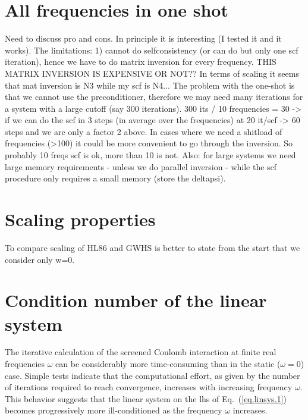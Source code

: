 \documentclass[twocolumn,prb,showpacs,superscriptaddress]{revtex4}
\def\w{\omega}
\begin{document}
\section{All frequencies in one shot}

Need to discuss pro and cons. In principle it is interesting (I tested it and it works).
The limitations: 1) cannot do selfconsistency (or can do but only one scf iteration),
hence we have to do matrix inversion for every frequency.
THIS MATRIX INVERSION IS EXPENSIVE OR NOT??
In terms of scaling it seems that mat inversion is N3 while my scf is N4...
The problem with the one-shot is that we cannot use the preconditioner,
therefore we may need many iterations for a system with a large cutoff
(say 300 iterations). 300 its / 10 frequencies = 30 -> if we can do the
scf in 3 steps (in average over the frequencies) at 20 it/scf -> 60 steps
and we are only a factor 2 above.
In cases where we need a shitload of frequencies (>100) it could be
more convenient to go through the inversion.
So probably 10 freqs scf is ok, more than 10 is not.
Also: for large systems we need large memory requirements - unless we do parallel inversion -
while the scf procedure only requires a small memory (store the deltapsi).

\section{Scaling properties}

To compare scaling of HL86 and GWHS is better to state from the start that
we consider only w=0.

\section{Condition number of the linear system}

The iterative calculation of the screened Coulomb interaction at finite real
frequencies $\w$ can be considerably more time-consuming than in the static
($\w=0$) case. Simple tests indicate that the computational effort, as given
by the number of iterations required to reach convergence, increases with 
increasing frequency $\w$. This behavior suggests that the linear system 
on the lhs of Eq.\ (\ref{eq.linsys.1}) becomes progressively more ill-conditioned 
as the frequency $\w$ increases.
\end{document}
